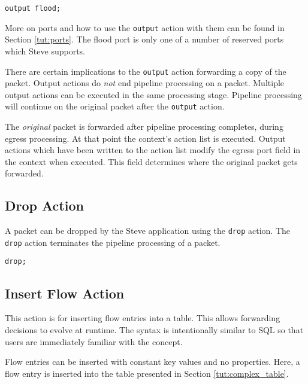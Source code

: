 \begin{codepage}
\begin{lstlisting}
output flood;
\end{lstlisting}
\end{codepage}

More on ports and how to use the \texttt{output} action with them can
be found in Section \ref{tut:ports}. The flood port is only one
of a number of reserved ports which Steve supports.

There are certain implications to the \texttt{output} action forwarding a copy of the packet. 
Output actions do \emph{not} end pipeline processing on a packet.
Multiple output actions can be executed in the same processing stage. 
Pipeline processing will continue
on the original packet after the \texttt{output} action.

The \textit{original} packet is forwarded after pipeline processing completes,
during egress processing.
At that point the context's action list is executed.
Output actions which have been written to the action list modify the
egress port field in the context when executed.
This field determines where the original packet gets forwarded.

\subsection{Drop Action} \label{tut:drop_action}

A packet can be dropped by the Steve application using the \texttt{drop} action.
The \texttt{drop} action terminates the pipeline processing of a packet.

\begin{codepage}
\begin{lstlisting}
drop;
\end{lstlisting}
\end{codepage}

\subsection{Insert Flow Action} \label{tut:insert_flow_action}

This action is for inserting flow entries into a table.
This allows forwarding decisions to evolve at runtime. The syntax is intentionally similar to SQL so that users are immediately familiar with the concept.

Flow entries can be inserted with constant key values and no properties. Here,
a flow entry is inserted into the table presented in Section
\ref{tut:complex_table}.


